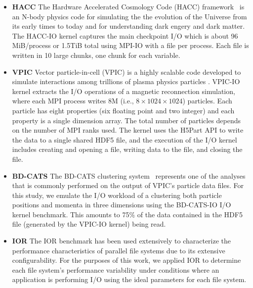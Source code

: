 \begin{itemize}
\item \textbf{HACC}
The Hardware Accelerated Cosmology Code (HACC) framework~\cite{habib2012}
is an N-body physics code for simulating the the evolution of the Universe
from its early times to today and for understanding dark engery and dark matter.
The HACC-IO kernel captures the main checkpoint I/O which is about
96 MiB/process or 1.5TiB total using MPI-IO with a file per process. Each
file is written in 10 large chunks, one chunk for each variable.
\item \textbf{VPIC} 
Vector particle-in-cell (VPIC) is a highly scalable code developed to simulate
interactions among trillions of plasma physics particles  \cite{Bowers2008}.
VPIC-IO kernel extracts the I/O operations of a magnetic reconnection
simulation, where each MPI process writes 8M (i.e., $8 \times 1024 \times 1024$) particles. Each
particle has eight properties (six floating point and two integer) and each
property is a single dimension array. The total number of particles depends on
the number of MPI ranks used. The kernel uses the H5Part API \cite{H5Part} to write
the data to a single shared HDF5 file, and the execution of the I/O kernel includes
creating and opening a file, writing data to the file, and closing the file.

\item \textbf{BD-CATS} The BD-CATS clustering system~\cite{Patwary2015}  represents
one of the analyses that is commonly performed on the output of VPIC's particle data files.
For this study, we emulate the I/O workload of a clustering both particle
positions and momenta in three dimensions using the BD-CATS-IO I/O kernel benchmark.  This amounts to 75\% of the data
contained in the HDF5 file (generated by the VPIC-IO kernel) being read.

\item \textbf{IOR} The IOR benchmark has been used extensively
to characterize the performance characteristics of parallel file systems\cite{Yildiz2016,Xie2012,Lofstead2010,Uselton2010}
due to its extensive configurability.  For the purposes of this work, we applied
IOR to determine each file system's performance variability under conditions
where an application is performing I/O using the ideal parameters for each
file system.

\end{itemize}

